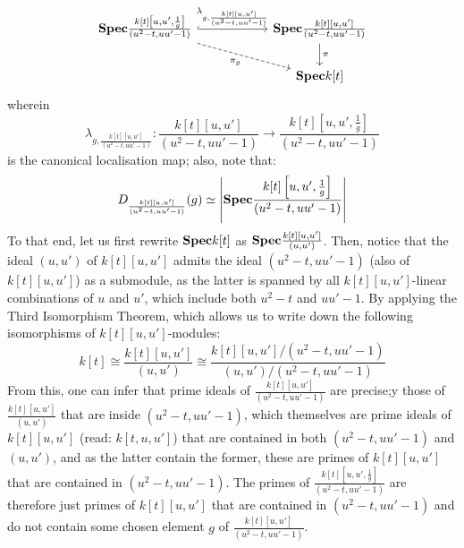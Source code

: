 \begin{example}
\begin{enumerate}
                            $$
                                \begin{tikzcd}
                                	{\Spec \frac{k[t]\left[u, u', \frac1g\right]}{(u^2 - t, uu' - 1)}} && {\Spec \frac{k[t][u, u']}{(u^2 - t, uu' - 1)}} \\
                                	& {} & {\Spec k[t]}
                                	\arrow["\pi", from=1-3, to=2-3]
                                	\arrow["{\lambda_{g, \frac{k[t][u, u']}{(u^2 - t, uu' - 1)}}}", hook, from=1-1, to=1-3]
                                	\arrow["{\pi_g}"', dashed, from=1-1, to=2-3]
                                \end{tikzcd}
                            $$
                        wherein
                            $$\lambda_{g, \frac{k[t][u, u']}{(u^2 - t, uu' - 1)}}: \frac{k[t][u, u']}{(u^2 - t, uu' - 1)} \to \frac{k[t]\left[u, u', \frac1g\right]}{(u^2 - t, uu' - 1)}$$
                        is the canonical localisation map; also, note that:
                            $$D_{\frac{k[t][u, u']}{(u^2 - t, uu' - 1)}}(g) \simeq \left|\mathbf{Spec} \frac{k[t]\left[u, u', \frac1g\right]}{(u^2 - t, uu' - 1)}\right|$$
                        To that end, let us first rewrite $\mathbf{Spec} k[t]$ as $\mathbf{Spec} \frac{k[t][u, u']}{(u, u')}$. Then, notice that the ideal $(u, u')$ of $k[t][u, u']$ admits the ideal $(u^2 - t, uu' - 1)$ (also of $k[t][u, u']$) as a submodule, as the latter is spanned by all $k[t][u, u']$-linear combinations of $u$ and $u'$, which include both $u^2 - t$ and $uu' - 1$. By applying the Third Isomorphism Theorem, which allows us to write down the following isomorphisms of $k[t][u, u']$-modules:
                            $$k[t] \cong \frac{k[t][u, u']}{(u, u')} \cong \frac{k[t][u, u']/(u^2 - t, uu' - 1)}{(u, u')/(u^2 - t, uu' - 1)}$$
                        From this, one can infer that prime ideals of $\frac{k[t][u, u']}{(u^2 - t, uu' - 1)}$ are precise;y those of $\frac{k[t][u, u']}{(u, u')}$ that are inside $(u^2 - t, uu' - 1)$, which themselves are prime ideals of $k[t][u, u']$ (read: $k[t, u, u']$) that are contained in both $(u^2 - t, uu' - 1)$ and $(u, u')$, and as the latter contain the former, these are primes of $k[t][u, u']$ that are contained in $(u^2 - t, uu' - 1)$. The primes of $\frac{k[t]\left[u, u', \frac1g\right]}{(u^2 - t, uu' - 1)}$ are therefore just primes of $k[t][u, u']$ that are contained in $(u^2 - t, uu' - 1)$ and do not contain some chosen element $g$ of $\frac{k[t]\left[u, u'\right]}{(u^2 - t, uu' - 1)}$. 
                    \end{enumerate}
            \end{example}
    
